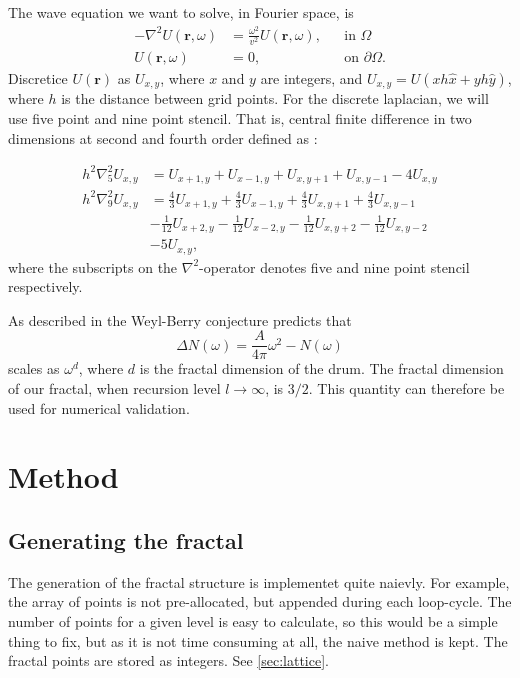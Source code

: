\documentclass[a4paper, 12pt]{article}
\let\vec\mathbf  %
\begin{document}
The wave equation we want to solve, in Fourier space, is
\begin{subequations}
  \label{eq:helm}
  \begin{align}
    -\nabla^2 U(\vec{r}, \omega) &= \frac{\omega^2}{v^2} U(\vec{r}, \omega), &&\text{in } \Omega\\
    U(\vec{r}, \omega) &= 0, &&\text{on } \partial \Omega.
  \end{align}
\end{subequations}
Discretice $U(\vec{r})$ as $U_{x,y}$, where $x$ and $y$ are integers, and $U_{x,y} = U(xh\hat{x} + yh\hat{y})$, where $h$ is the distance between grid points.
For the discrete laplacian, we will use five point and nine point stencil.
That is, central finite difference in two dimensions at second and fourth order defined as \cite{wiki:DifferenceCoef}\cite{wiki:FivePoint}:

\begin{subequations}
  \label{eq:stencil}
  \begin{align}
  h^2\nabla_5^2 U_{x,y} &=
  U_{x+1,y} + U_{x-1,y} + U_{x,y+1} + U_{x,y-1} - 4 U_{x,y}\\
  h^2\nabla_9^2 U_{x,y} &=
  \frac43 U_{x+1,y} + \frac43 U_{x-1,y} + \frac43 U_{x,y+1} + \frac43 U_{x,y-1}\\
  & -\frac{1}{12}U_{x+2,y} - \frac{1}{12}U_{x-2,y} - \frac{1}{12}U_{x,y+2} - \frac{1}{12}U_{x,y-2}\nonumber\\
  &- 5 U_{x,y}\nonumber,
  \end{align}
\end{subequations}
where the subscripts on the $\nabla^2$-operator denotes five and nine point stencil respectively.

As described in \cite{exercise} the Weyl-Berry conjecture predicts that
\begin{equation}
  \Delta N(\omega) = \frac{A}{4\pi} \omega^2 - N(\omega)
\end{equation}
scales as $\omega^d$, where $d$ is the fractal dimension of the drum.
The fractal dimension of our fractal, when recursion level $l\rightarrow\infty$, is $3/2$\cite{exercise}.
This quantity can therefore be used for numerical validation.

\section{Method}
\subsection{Generating the fractal}
The generation of the fractal structure is implementet quite naievly.
For example, the array of points is not pre-allocated, but appended during each loop-cycle.
The number of points for a given level is easy to calculate, so this would be a simple thing to fix, but as it is not time consuming at all, the naive method is kept.
The fractal points are stored as integers.
See \ref{sec:lattice}.
\end{document}
